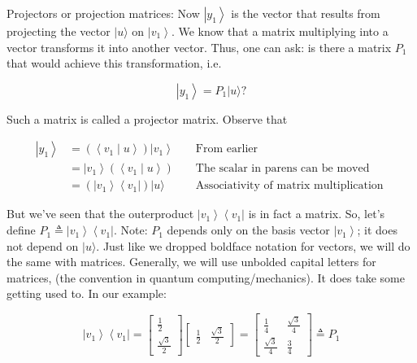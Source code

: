 \documentclass[main.tex]{subfiles}
\begin{document}
    Projectors or projection matrices: Now $\left|y_{1}\right\rangle$ is the vector that results from projecting the vector $|u\rangle$ on $\left|v_{1}\right\rangle$. We know that a matrix multiplying into a vector transforms it into another vector. Thus, one can ask: is there a matrix $P_{1}$ that would achieve this transformation, i.e.
    
    $$
    \left|y_{1}\right\rangle=P_{1}|u\rangle ?
    $$
    
    Such a matrix is called a projector matrix. Observe that
    
    $$
    \begin{aligned}
    \left|y_{1}\right\rangle &=\left(\left\langle v_{1} \mid u\right\rangle\right)\left|v_{1}\right\rangle & & \text { From earlier } \\
    &=\left|v_{1}\right\rangle\left(\left\langle v_{1} \mid u\right\rangle\right) & & \text { The scalar in parens can be moved } \\
    &=\left(\left|v_{1}\right\rangle\left\langle v_{1}\right|\right)|u\rangle & & \text { Associativity of matrix multiplication }
    \end{aligned}
    $$
    
    But we've seen that the outerproduct $\left|v_{1}\right\rangle\left\langle v_{1}\right|$ is in fact a matrix. So, let's define $P_{1} \triangleq\left|v_{1}\right\rangle\left\langle v_{1}\right|$. Note: $P_{1}$ depends only on the basis vector $\left|v_{1}\right\rangle$; it does not depend on $|u\rangle$. Just like we dropped boldface notation for vectors, we will do the same with matrices. Generally, we will use unbolded capital letters for matrices, (the convention in quantum computing/mechanics). It does take some getting used to. In our example:
    
    $$
    \left|v_{1}\right\rangle\left\langle v_{1}\right|=\left[\begin{array}{r}
    \frac{1}{2} \\
    \frac{\sqrt{3}}{2}
    \end{array}\right]\left[\begin{array}{ll}
    \frac{1}{2} & \frac{\sqrt{3}}{2}
    \end{array}\right]=\left[\begin{array}{cc}
    \frac{1}{4} & \frac{\sqrt{3}}{4} \\
    \frac{\sqrt{3}}{4} & \frac{3}{4}
    \end{array}\right] \triangleq P_{1}
    $$
    
\end{document}
